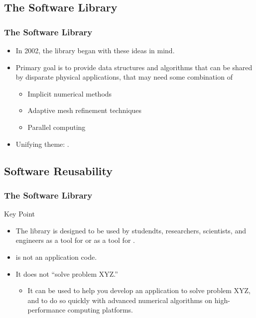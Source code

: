  

\subsection{The \libmesh{} Software Library}
\frame
{
  \frametitle{The \libmesh{} Software Library}
  \begin{itemize}
    \item In 2002, the \libmesh{} library began with these ideas in mind.
    \item Primary goal is to provide data structures and algorithms that can be shared by disparate physical applications, that may need some combination of
      \begin{itemize}
      \item Implicit numerical methods
      \item Adaptive mesh refinement techniques
      \item Parallel computing
      \end{itemize}
    \item Unifying theme: .
  \end{itemize}
}



 

\subsection{Software Reusability}
\frame
{
  \frametitle{The \libmesh{} Software Library}

  \begin{block}{Key Point}
    \begin{itemize}
      \item The \libmesh{} library is designed to be used by studendts, researchers, scientists, and engineers as a tool for  or as a tool for .
      \item \libMesh{} is not an application code.
      \item It does not ``solve problem XYZ.''
        \begin{itemize}
          \item It can be used to help you develop an application to solve problem XYZ, and to do so quickly with advanced numerical algorithms on high-performance computing platforms.
        \end{itemize}
    \end{itemize}    
  \end{block}
} 



